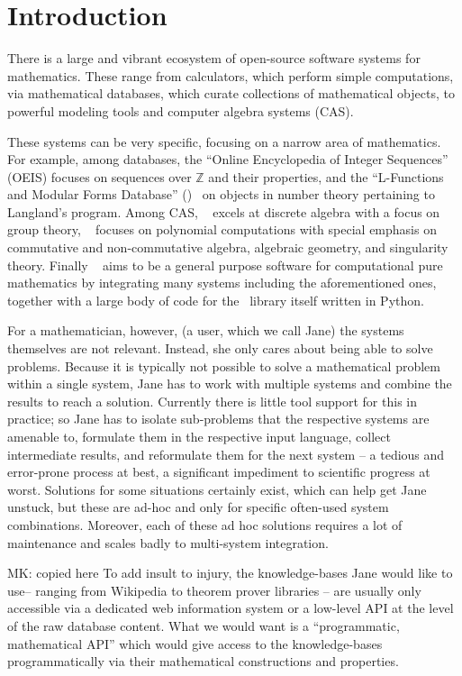 \section{Introduction}\label{sec:intro}

There is a large and vibrant ecosystem of open-source software systems for mathematics. 
These range from calculators, which perform simple computations, via mathematical databases, which curate collections of mathematical objects, to powerful modeling tools and computer algebra systems (CAS).

These systems can be very specific, focusing on a narrow area of mathematics.  For example, among databases, the ``Online Encyclopedia of Integer Sequences'' (OEIS) focuses on sequences over $\mathbb{Z}$ and their properties, and the ``L-Functions and Modular Forms Database'' (\LMFDB)~\cite{Cremona:LMFDB16,lmfdb:on} on objects in number theory pertaining to Langland's program.  Among CAS, \GAP~\cite{GAP:on} excels at discrete algebra with a focus on group theory, \Singular~\cite{singular:on} focuses on polynomial computations with special emphasis on commutative and non-commutative algebra, algebraic geometry, and singularity theory. Finally \Sage~\cite{SageMath:on} aims to be a general purpose software for computational pure mathematics by integrating many systems including the aforementioned ones, together with a large body of code for the \Sage\ library itself written in Python.

For a mathematician, however, (a user, which we call Jane) the systems themselves are not relevant.
Instead, she only cares about being able to solve problems. 
Because it is typically not possible to solve a mathematical problem within a single system, Jane has to work with multiple systems and combine the results to reach a solution. 
Currently there is little tool support for this in practice; so Jane has to isolate sub-problems that the respective systems are amenable to, formulate them in the respective input language, collect intermediate results, and reformulate them for the next system -- a tedious and error-prone process at best, a significant impediment to scientific progress at worst.
Solutions for some situations certainly exist, which can help get Jane unstuck, but these are ad-hoc and only for specific often-used system combinations. 
Moreover, each of these ad hoc solutions requires a lot of maintenance and scales badly to
multi-system integration.
\begin{newpart}{MK: copied here}
  To add insult to injury, the knowledge-bases Jane would like to use-- ranging from Wikipedia to theorem prover libraries -- are usually only accessible via a dedicated web information system or a low-level API at the level of the raw database content.  
What we would want is a ``programmatic, mathematical API'' which would give access to the knowledge-bases programmatically via their mathematical constructions and properties.
\end{newpart}

